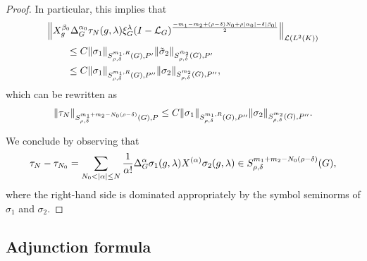 \begin{proof}
    In particular,
    this implies that
    \begin{align*}
        &\norm [\Lin {\Lebesgue 2 \CompactGroup}] {%
        \LeftDifferentialOperator [g] {\beta_0}
        \DifferenceOperatorOrder {\alpha_0}
        \tau_N(g, \lambda)
        \Rep \lambda \BesselPotential {-m_1 - m_2 + (\rho - \delta) N_0 + \rho \abs {\alpha_0} - \delta \abs {\beta_0}}
        }\\
        &\qquad \leq C \SymbolSemiNorm {m_1, R} {\rho, \delta} {P'} {\sigma_1} \SymbolSemiNorm {\tilde m_2} {\rho, \delta} {P'} {\tilde \sigma_2}\\
        &\qquad \leq C \SymbolSemiNorm {m_1, R} {\rho, \delta} {P''} {\sigma_1} \SymbolSemiNorm {m_2} {\rho, \delta} {P''} {\sigma_2},
    \end{align*}
    which can be rewritten as
    \begin{align*}
        \SymbolSemiNorm {m_1 + m_2 - N_0 (\rho - \delta)} {\rho, \delta} P {\tau_N}
        \leq C \SymbolSemiNorm {m_1, R} {\rho, \delta} {P''} {\sigma_1} \SymbolSemiNorm {m_2} {\rho, \delta} {P''} {\sigma_2}.
    \end{align*}

    We conclude by observing that
    \begin{align*}
        \tau_N - \tau_{N_0}
        = \sum_{N_0 < \abs \alpha \leq N}
        \frac 1 {\alpha!}
        \DifferenceOperatorOrder \alpha \sigma_1(g, \lambda)
        \TaylorLeftDifferentialOperator \alpha \sigma_2(g, \lambda)
        \in \SymbolClass {m_1 + m_2 - N_0 (\rho - \delta)} {\rho, \delta},
    \end{align*}
    where the right-hand side is dominated appropriately by the symbol seminorms of $\sigma_1$ and $\sigma_2$.
\end{proof}

\subsection{Adjunction formula}

